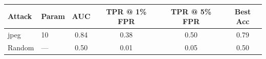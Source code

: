 \begin{tabular}{llcccc}
\toprule
Attack & Param & AUC & TPR @ 1\% FPR & TPR @ 5\% FPR & Best Acc \\
\midrule
jpeg & 10 & 0.84 & 0.38 & 0.50 & 0.79 \\
Random & — & 0.50 & 0.01 & 0.05 & 0.50 \\
\bottomrule
\end{tabular}
